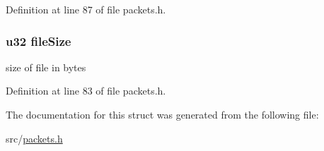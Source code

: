 Definition at line 87 of file packets.\+h.

\hypertarget{struct_b_e_g_i_n___d_o_w_n_l_o_a_d_a2fa3c7a96f94c5dec20b07223cc8562e}{}
\subsubsection[{file\+Size}]{ {\bf u32} file\+Size}\label{struct_b_e_g_i_n___d_o_w_n_l_o_a_d_a2fa3c7a96f94c5dec20b07223cc8562e}
size of file in bytes 

Definition at line 83 of file packets.\+h.



The documentation for this struct was generated from the following file\+:\begin{DoxyCompactItemize}
\item 
src/\hyperlink{packets_8h}{packets.\+h}\end{DoxyCompactItemize}
